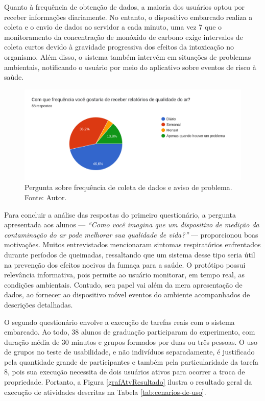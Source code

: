 Quanto à frequência de obtenção de dados, a maioria dos usuários optou por receber informações diariamente. No entanto, o dispositivo embarcado realiza a coleta e o envio de dados ao servidor a cada minuto, uma vez 7
que o monitoramento da concentração de monóxido de carbono exige intervalos de coleta curtos devido à gravidade progressiva dos efeitos da intoxicação no organismo. Além disso, o sistema também intervém em situações 
de problemas ambientais, notificando o usuário por meio do aplicativo sobre eventos de risco à saùde.

\begin{figure}[ht]
    \centering
    \includegraphics[width=.64\textwidth]{img/questionario/1/graf-info-frequencia.png}
    \caption{Pergunta sobre frequência de coleta de dados e aviso de problema. Fonte: Autor.}\label{grafFrequenciaInfo}
\end{figure}

Para concluir a análise das respostas do primeiro questionário, a pergunta apresentada aos alunos — \textit{``Como você imagina que um dispositivo de medição da contaminação do ar pode melhorar sua qualidade de vida?''} — proporcionou boas motivações. Muitos 
entrevistados mencionaram sintomas respiratórios enfrentados durante períodos de queimadas, ressaltando que um sistema desse tipo seria útil na prevenção dos efeitos nocivos da fumaça para a saúde. O protótipo possui 
relevância informativa, pois permite ao usuário monitorar, em tempo real, as condições ambientais. Contudo, seu papel vai além da mera apresentação de dados, ao fornecer ao dispositivo móvel eventos do ambiente 
acompanhados de descrições detalhadas.

O segundo questionário envolve a execução de tarefas reais com o sistema embarcado. Ao todo, 38 alunos de graduação participaram 
do experimento, com duração média de 30 minutos e grupos formados por duas ou três pessoas. O uso de grupos no teste de usabilidade, e não indivíduos separadamente, é justificado 
pela quantidade grande de participantes e também pela particularidade da tarefa 8, pois sua execução necessita de dois usuários ativos para ocorrer a troca de propriedade. Portanto, 
a Figura \ref{grafAtvResultado} ilustra o resultado geral da execução de atividades descritas na Tabela \ref{tab:cenarios-de-uso}. 

